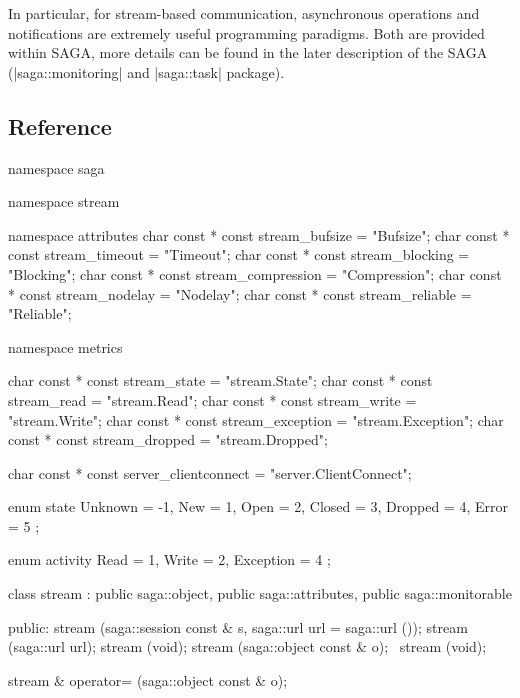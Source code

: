   In particular, for stream-based communication, asynchronous operations
  and notifications are extremely useful programming paradigms.  Both
  are provided within SAGA, more details can be found in the later
  description of the SAGA \LF (|saga::monitoring| and |saga::task|
  package).


 \subsection{Reference}

  \begin{mycode}[label=Prototypes: saga::stream]
  namespace saga
  {
    namespace stream 
    {
      namespace attributes 
      {
        char const * const stream_bufsize       = "Bufsize";
        char const * const stream_timeout       = "Timeout";
        char const * const stream_blocking      = "Blocking";
        char const * const stream_compression   = "Compression";
        char const * const stream_nodelay       = "Nodelay";
        char const * const stream_reliable      = "Reliable";
      }

      namespace metrics 
      {
        char const * const stream_state         = "stream.State";
        char const * const stream_read          = "stream.Read";
        char const * const stream_write         = "stream.Write";
        char const * const stream_exception     = "stream.Exception";
        char const * const stream_dropped       = "stream.Dropped";

        char const * const server_clientconnect = "server.ClientConnect";
      }

      enum state
      {
        Unknown      = -1,
        New          =  1,
        Open         =  2,
        Closed       =  3,
        Dropped      =  4,
        Error        =  5
      };

      enum activity
      {
        Read         =  1,
        Write        =  2,
        Exception    =  4
      };

      class stream 
          : public saga::object,
            public saga::attributes,
            public saga::monitorable
      {
        public:
          stream (saga::session const & s, 
                  saga::url             url = saga::url ());
          stream (saga::url             url);
          stream (void);
          stream (saga::object const  & o);
         ~stream (void);

          stream & operator= (saga::object const & o);

}}}
\end{mycode}
